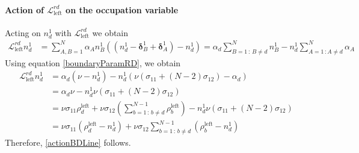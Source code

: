 \documentclass[10pt]{article}
\numberwithin{equation}{section}
\numberwithin{equation}{subsection}
\begin{document}
\paragraph{Action of $\mathcal{L}_{\text{left}}^{rd}$ on the occupation variable}
Acting on $n_{d}^{1}$  with $\mathcal{L}_{\text{left}}^{rd}$ we obtain
\begin{equation}\label{actionBoudaryRD}
	\begin{split}
		\mathcal{L}_{\text{left}}^{rd}n_{d}^{1}&=\sum_{A,B=1}^{N}\alpha_{A}n_{B}^{1}\left((n_{d}^{1}-\bm{\delta}_{B}^{1}+\bm{\delta}_{A}^{1})-n_{d}^{1}\right)=\alpha_{d}\sum_{B=1\,:\,B\neq d}^{N}n_{B}^{1}-n_{d}^{1}\sum_{A=1\,:A\neq d}^{N}\alpha_{A}
	\end{split}
\end{equation}
Using equation \eqref{boundaryParamRD}, we obtain 
\begin{align}
			\mathcal{L}_{\text{left}}^{rd}n_{d}^{1}&=
		\alpha_{d}\left(\nu-n_{d}^{1}\right)-n_{d}^{1}\left(\nu(\sigma_{11}+(N-2)\sigma_{12})-\alpha_{d}\right)\nonumber
		\\&=\alpha_{d}\nu-n_{d}^{1}\nu(\sigma_{11}+(N-2)\sigma_{12})\nonumber
		\\&=
		\nu\sigma_{11}\rho_{d}^{\text{left}}+\nu\sigma_{12}\left(\sum_{b=1\,:\,b\neq d}^{N-1}\rho_{b}^{\text{left}}\right)-n_{d}^{1}\nu(\sigma_{11}+(N-2)\sigma_{12})\nonumber
		\\&=
		\nu \sigma_{11} (\rho_{d}^{\text{left}}-n_{d}^{1})+\nu\sigma_{12}\sum_{b=1\,:\,b\neq d}^{N-1}(\rho_{b}^{\text{left}}-n_{d}^{1})
	\end{align}
Therefore, \eqref{actionBDLine} follows.


\end{document}
